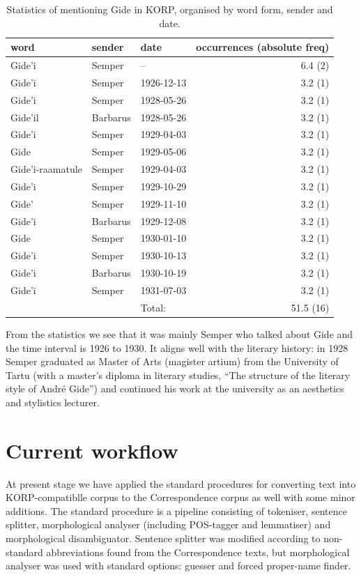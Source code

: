 \documentclass[runningheads]{llncs}
\begin{document}
\begin{table}
\caption{Statistics of mentioning Gide in KORP, organised by word form, sender and date.}\label{tab1}
\begin{tabular}{| l | l | l | r|}
  \hline
  word & sender & date & occurrences (absolute freq) \\
  \hline
  Gide'i & Semper & -- & 6.4 (2)\\
  Gide'i & Semper & 1926-12-13 & 3.2 (1)\\
  Gide'i & Semper & 1928-05-26 & 3.2 (1)\\
  Gide'il & Barbarus & 1928-05-26 & 3.2 (1)\\
  Gide'i & Semper & 1929-04-03 & 3.2 (1)\\
  Gide & Semper & 1929-05-06 & 3.2 (1)\\
  Gide'i-raamatule & Semper & 1929-04-03 & 3.2 (1)\\
  Gide'i & Semper & 1929-10-29 & 3.2 (1)\\
  Gide' & Semper & 1929-11-10 & 3.2 (1)\\
  Gide'i & Barbarus & 1929-12-08 & 3.2 (1)\\
  Gide & Semper & 1930-01-10 & 3.2 (1)\\
  Gide'i & Semper & 1930-10-13 & 3.2 (1)\\
  Gide'i & Barbarus & 1930-10-19 & 3.2 (1)\\
  Gide'i & Semper & 1931-07-03 & 3.2 (1)\\
  \hline
  &&Total:&51.5 (16)\\
\hline
\end{tabular}
\end{table}


From the statistics we see that it was mainly Semper who talked about Gide and the time interval is 1926 to 1930. It aligns well with the literary history: in 1928 Semper graduated as Master of Arts (magister artium) from the University of Tartu (with a master’s diploma in literary studies, ``The structure of the literary style of Andr\'e Gide'') and continued his work at the university as an aesthetics and stylistics lecturer.

\section{Current workflow}

At present stage we have applied the standard procedures for converting text into KORP-compatiblle corpus to the Correspondence corpus as well with some minor additions.  The standard procedure is a pipeline consisting of tokeniser, sentence splitter, morphological analyser (including POS-tagger and lemmatiser) and morphological disambiguator.  Sentence splitter was modified according to non-standard abbreviations found from the Correspondence texts, but morphological analyser was used with standard options: guesser and forced proper-name finder.
\end{document}

